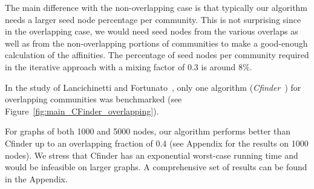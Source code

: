The main difference with the non-overlapping case is that typically our
algorithm needs a larger seed node percentage per community. This is not
surprising since in the overlapping case, we would need seed nodes from the
various overlaps as well as from the non-overlapping portions of communities to
make a good-enough calculation of the affinities. The percentage of seed nodes
per community required in the iterative approach with a mixing factor of $0.3$
is around 8$\%$.  

In the study of Lancichinetti and Fortunato~\cite{LF09}, only one algorithm
(\emph{Cfinder}~\cite{PDFV05}) for overlapping communities was benchmarked (see
Figure~\ref{fig:main_CFinder_overlapping}). 

For graphs of both 1000 and 5000 nodes, our algorithm performs better 
than Cfinder up to an overlapping fraction of $0.4$ (see Appendix for 
the results on 1000 nodes). We stress that Cfinder 
has an exponential worst-case running time and would be infeasible on 
larger graphs. A comprehensive set of results can be found in the Appendix. 






